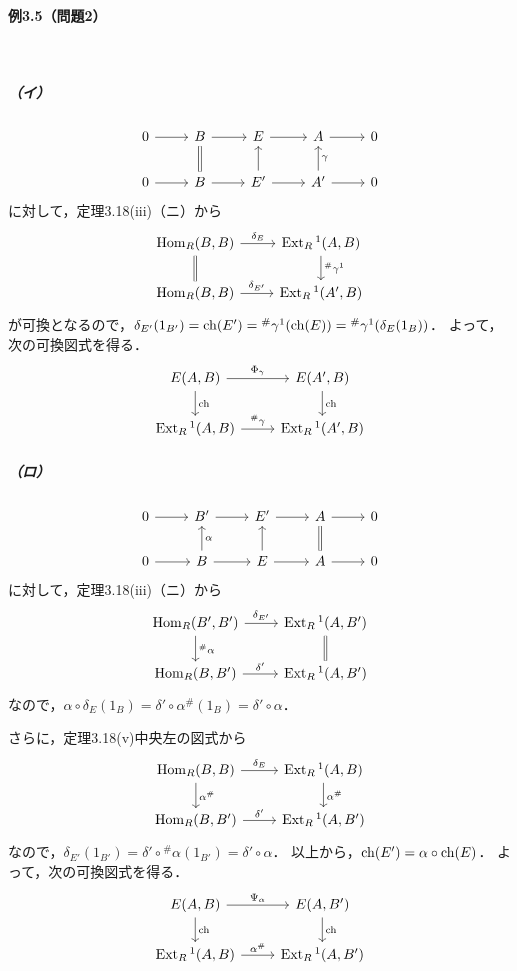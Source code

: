 \paragraph{例3.5（問題2）}~
\subparagraph{（イ）}
\[
\begin{tikzcd}
  0 \arrow[r] & B \arrow[r]\arrow[d, equal] & E \arrow[r] & A \arrow[r] & 0 \\
  0 \arrow[r] & B \arrow[r] & E' \arrow[r]\arrow[u] & A' \arrow[r]\arrow[u, "\gamma"'] & 0
\end{tikzcd}
\]
に対して，定理3.18(iii)（ニ）から
\[
\begin{tikzcd}
  \Hom_R(B, B) \arrow[r, "\delta_E"]\arrow[d, equal] & \Ext_R{}^1(A, B) \arrow[d, "{}^\#\gamma^1"] \\
  \Hom_R(B, B) \arrow[r, "\delta_{E'}"] & \Ext_R{}^1(A', B)
\end{tikzcd}
\]
が可換となるので，$\delta_{E'}(1_{B'}) = \operatorname{ch}(E') = {}^\#\gamma^1 (\operatorname{ch}(E)) = {}^\#\gamma^1 (\delta_E(1_B))$．
よって，次の可換図式を得る．
\[
\begin{tikzcd}
  E(A, B) \arrow[r, "\Phi_\gamma"]\arrow[d, "\ch"] & E(A', B)\arrow[d, "\ch"] \\
  \Ext_R{}^1(A, B) \arrow[r, "^\#\gamma"] & \Ext_R{}^1(A', B)
\end{tikzcd}
\]

\subparagraph{（ロ）}
\[
\begin{tikzcd}
  0 \arrow[r] & B' \arrow[r] & E' \arrow[r] & A \arrow[r]\arrow[d, equal] & 0 \\
  0 \arrow[r] & B \arrow[r]\arrow[u, "\alpha"'] & E \arrow[r]\arrow[u] & A \arrow[r] & 0
\end{tikzcd}
\]
に対して，定理3.18(iii)（ニ）から
\[
\begin{tikzcd}
  \Hom_R(B', B') \arrow[r, "\delta_{E'}"]\arrow[d, "^\#\alpha"] & \Ext_R{}^1(A, B') \arrow[d, equal] \\
  \Hom_R(B, B') \arrow[r, "\delta'"] & \Ext_R{}^1(A, B')
\end{tikzcd}
\]
なので，$\alpha \circ \delta_E(1_B) = \delta' \circ \alpha^\# (1_B) = \delta' \circ \alpha$．

さらに，定理3.18(v)中央左の図式から
\[
\begin{tikzcd}
  \Hom_R(B, B) \arrow[r, "\delta_E"]\arrow[d, "\alpha^\#"] & \Ext_R{}^1(A, B) \arrow[d, "\alpha^\#"] \\
  \Hom_R(B, B') \arrow[r, "\delta'"] & \Ext_R{}^1(A, B')
\end{tikzcd}
\]
なので，$\delta_{E'}(1_{B'}) = \delta' \circ {}^\#\alpha (1_{B'}) = \delta' \circ \alpha$．
以上から，$\operatorname{ch}(E') = \alpha \circ \operatorname{ch}(E)$．
よって，次の可換図式を得る．
\[
\begin{tikzcd}
  E(A, B) \arrow[r, "\Psi_\alpha"]\arrow[d, "\ch"] & E(A, B')\arrow[d, "\ch"] \\
  \Ext_R{}^1(A, B) \arrow[r, "\alpha^\#"] & \Ext_R{}^1(A, B')
\end{tikzcd}
\]


